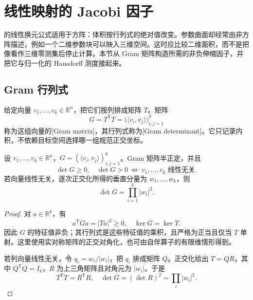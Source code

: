 \section{线性映射的 Jacobi 因子}
\label{b1:sec:1701}

的线性换元公式适用于方阵：体积按行列式的绝对值改变。参数曲面却经常由非方阵描述，例如一个二维参数块可以映入三维空间。这时应比较二维面积，而不是把像看作三维零测集后停止计算。本节从 Gram 矩阵构造所需的非负伸缩因子，并把它与归一化的 Hausdorff 测度接起来。


\subsection{Gram 行列式}
\label{b1:subsec:170101}

给定向量 \(v_1,\ldots,v_k\in\mathbb R^n\)，把它们按列排成矩阵 \(T\)。矩阵
\[
 G=T^{\mathsf T}T
   =\bigl(\langle v_i,v_j\rangle\bigr)_{i,j=1}^k
\]
称为这组向量的[Gram matrix]，其行列式称为[Gram determinant]。它只记录内积，不依赖目标空间选择哪一组规范正交坐标。

\begin{proposition}\label{b1:prop:gram-determinant}
设 \(v_1,\ldots,v_k\in\mathbb R^n\)，\(G=(\langle v_i,v_j\rangle)_{i,j=1}^k\)。Gram 矩阵半正定，并且
\[
 \det G\geq0,\quad
 \det G>0\ \Longleftrightarrow\ v_1,\ldots,v_k\text{ 线性无关}.
\]
若向量线性无关，逐次正交化所得的垂直分量为 \(w_1,\ldots,w_k\)，则
\[
 \det G=\prod_{i=1}^k|w_i|^2.
\]
\end{proposition}
\begin{proof}
对 \(a\in\mathbb R^k\)，有
\[
 a^{\mathsf T}Ga=|Ta|^2\geq0,\quad \ker G=\ker T.
\]
因此 \(G\) 的特征值非负；其行列式是这些特征值的乘积，且严格为正当且仅当 \(T\) 单射。这里使用实对称矩阵的正交对角化，也可由自伴算子的有限维情形得到。

若列向量线性无关，令 \(q_i=w_i/|w_i|\)，把 \(q_i\) 排成矩阵 \(Q\)。正交化给出 \(T=QR\)，其中 \(Q^{\mathsf T}Q=I_k\)，\(R\) 为上三角矩阵且对角元为 \(|w_i|\)。于是
\[
 T^{\mathsf T}T=R^{\mathsf T}R,\quad
 \det G=(\det R)^2=\prod_i|w_i|^2.
\]
\end{proof}


